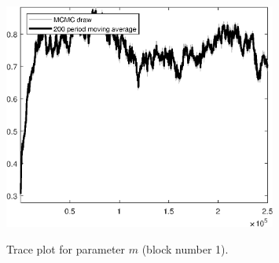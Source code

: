 \begin{figure}[H]
\centering
  \includegraphics[width=0.8\textwidth]{BRS_aggregate/graphs/TracePlot_m_blck_1}\\
    \caption{Trace plot for parameter ${m}$ (block number 1).}
\end{figure}

